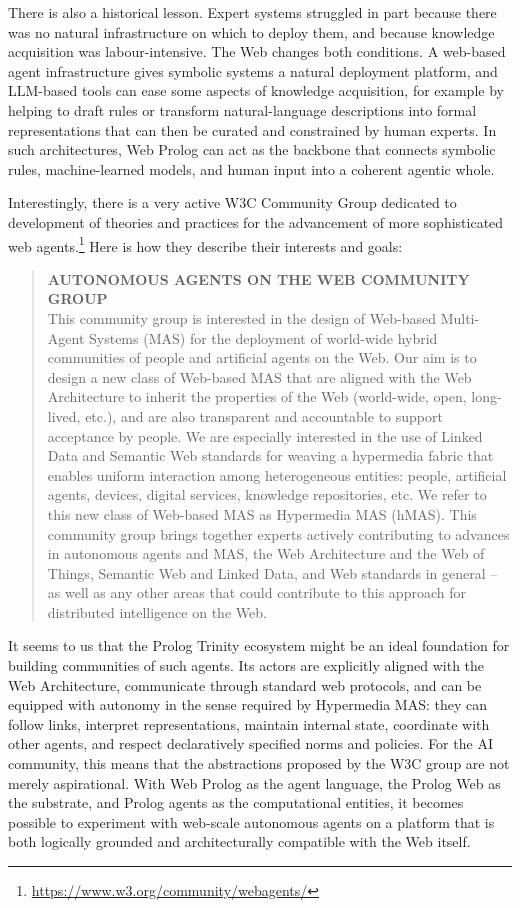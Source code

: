 There is also a historical lesson. Expert systems struggled in part because there was no natural infrastructure on which to deploy them, and because knowledge acquisition was labour-intensive. The Web changes both conditions. A web-based agent infrastructure gives symbolic systems a natural deployment platform, and LLM-based tools can ease some aspects of knowledge acquisition, for example by helping to draft rules or transform natural-language descriptions into formal representations that can then be curated and constrained by human experts. In such architectures, Web Prolog can act as the backbone that connects symbolic rules, machine-learned models, and human input into a coherent agentic whole.

Interestingly, there is a very active W3C Community Group dedicated to development of theories and practices for the advancement of more sophisticated web agents.\footnote{\url{https://www.w3.org/community/webagents/}} Here is how they describe their interests and goals:

\begin{quotation}
\textbf{AUTONOMOUS AGENTS ON THE WEB COMMUNITY GROUP}\\
This community group is interested in the design of Web-based Multi-Agent Systems (MAS) for the deployment of world-wide hybrid communities of people and artificial agents on the Web. Our aim is to design a new class of Web-based MAS that are aligned with the Web Architecture to inherit the properties of the Web (world-wide, open, long-lived, etc.), and are also transparent and accountable to support acceptance by people. We are especially interested in the use of Linked Data and Semantic Web standards for weaving a hypermedia fabric that enables uniform interaction among heterogeneous entities: people, artificial agents, devices, digital services, knowledge repositories, etc. We refer to this new class of Web-based MAS as Hypermedia MAS (hMAS). This community group brings together experts actively contributing to advances in autonomous agents and MAS, the Web Architecture and the Web of Things, Semantic Web and Linked Data, and Web standards in general -- as well as any other areas that could contribute to this approach for distributed intelligence on the Web.
\end{quotation}

\noindent It seems to us that the Prolog Trinity ecosystem might be an ideal foundation for building communities of such agents. Its actors are explicitly aligned with the Web Architecture, communicate through standard web protocols, and can be equipped with autonomy in the sense required by Hypermedia MAS: they can follow links, interpret representations, maintain internal state, coordinate with other agents, and respect declaratively specified norms and policies. For the AI community, this means that the abstractions proposed by the W3C group are not merely aspirational. With Web Prolog as the agent language, the Prolog Web as the substrate, and Prolog agents as the computational entities, it becomes possible to experiment with web-scale autonomous agents on a platform that is both logically grounded and architecturally compatible with the Web itself.

